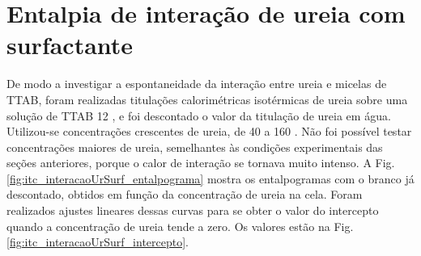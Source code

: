 

%

\section{Entalpia de interação de ureia com surfactante}

	De modo a investigar a espontaneidade da interação entre ureia e micelas de TTAB, foram realizadas titulações calorimétricas isotérmicas de ureia sobre uma solução de TTAB 12 \mM, e foi descontado o valor da titulação de ureia em água. Utilizou-se concentrações crescentes de ureia, de 40 a 160 \mM. Não foi possível testar concentrações maiores de ureia, semelhantes às condições experimentais das seções anteriores, porque o calor de interação se tornava muito intenso. A Fig. \ref{fig:itc_interacaoUrSurf_entalpograma} mostra os entalpogramas com o branco já descontado, obtidos em função da concentração de ureia na cela. Foram realizados ajustes lineares  dessas curvas para se obter o valor do intercepto quando a concentração de ureia tende a zero. Os valores estão na Fig. \ref{fig:itc_interacaoUrSurf_intercepto}.
	

